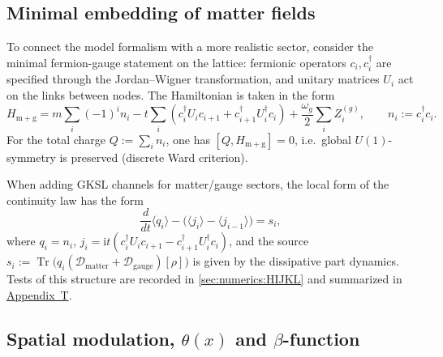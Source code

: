 \documentclass[11pt,a4paper]{article}
\DeclareMathOperator{\Tr}{Tr}
\newcommand{\ii}{\mathrm{i}}
\theoremstyle{definition}
\theoremstyle{plain}
\theoremstyle{remark}
\begin{document}
\subsection{Minimal embedding of matter fields}
\label{sec:theory:matter}

To connect the model formalism with a more realistic sector, consider the minimal fermion-gauge
statement on the lattice: fermionic operators $c_i,c_i^\dagger$ are specified through the Jordan--Wigner transformation,
and unitary matrices $U_i$ act on the links between nodes.
The Hamiltonian is taken in the form
\begin{equation}\label{eq:matter_hamiltonian}
H_{\mathrm{m+g}}
=
m\sum_i(-1)^i n_i
-t\sum_i\!\left(c_i^\dagger U_i c_{i+1}+c_{i+1}^\dagger U_i^\dagger c_i\right)
+\frac{\omega_g}{2}\sum_i Z_i^{(g)},
\qquad
n_i:=c_i^\dagger c_i.
\end{equation}
For the total charge $Q:=\sum_i n_i$, one has
$[Q,H_{\mathrm{m+g}}]=0$,
i.e.\ global $U(1)$-symmetry is preserved (discrete Ward criterion).

When adding GKSL channels for matter/gauge sectors, the local form of the continuity law has the form
\begin{equation}\label{eq:matter_continuity}
\frac{d}{dt}\langle q_i\rangle
-\bigl(\langle j_i\rangle-\langle j_{i-1}\rangle\bigr)
=
s_i,
\end{equation}
where $q_i=n_i$,
$j_i=\ii t\!\left(c_i^\dagger U_i c_{i+1}-c_{i+1}^\dagger U_i^\dagger c_i\right)$,
and the source
$s_i:=\Tr\!\bigl(q_i(\mathcal D_{\mathrm{matter}}+\mathcal D_{\mathrm{gauge}})[\rho]\bigr)$
is given by the dissipative part dynamics.
Tests of this structure are recorded in \cref{sec:numerics:HIJKL} and summarized in \hyperref[sec:appendix:toy]{Appendix~T}.

\subsection[Spatial modulation, theta(x) and beta function]{Spatial modulation, $\theta(x)$ and $\beta$-function}
\label{sec:theory:theta}
\end{document}
